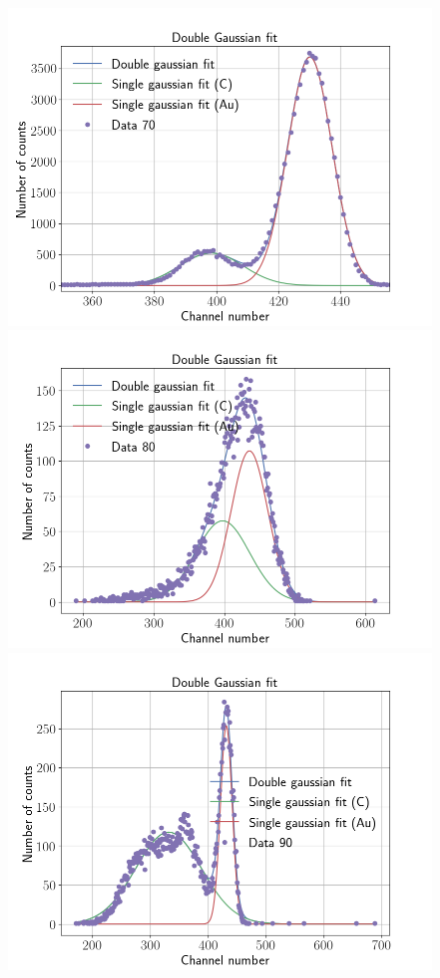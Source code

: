 \begin{figure}[H]
\includegraphics[width=0.99\columnwidth]{Data_70}
\includegraphics[width=0.99\columnwidth]{Data_80}
\includegraphics[width=0.99\columnwidth]{Data_90}
\end{figure}

